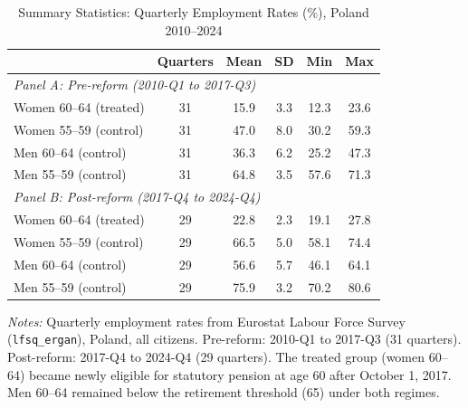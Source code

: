 \begin{table}[H]
\centering
\caption{Summary Statistics: Quarterly Employment Rates (\%), Poland 2010--2024}
\label{tab:summary}
\begin{threeparttable}
\begin{tabular}{lccccc}
\toprule
 & Quarters & Mean & SD & Min & Max \\
\midrule
\multicolumn{6}{l}{\textit{Panel A: Pre-reform (2010-Q1 to 2017-Q3)}} \\
Women 60--64 (treated) & 31 & 15.9 & 3.3 & 12.3 & 23.6 \\
Women 55--59 (control) & 31 & 47.0 & 8.0 & 30.2 & 59.3 \\
Men 60--64 (control) & 31 & 36.3 & 6.2 & 25.2 & 47.3 \\
Men 55--59 (control) & 31 & 64.8 & 3.5 & 57.6 & 71.3 \\
\midrule
\multicolumn{6}{l}{\textit{Panel B: Post-reform (2017-Q4 to 2024-Q4)}} \\
Women 60--64 (treated) & 29 & 22.8 & 2.3 & 19.1 & 27.8 \\
Women 55--59 (control) & 29 & 66.5 & 5.0 & 58.1 & 74.4 \\
Men 60--64 (control) & 29 & 56.6 & 5.7 & 46.1 & 64.1 \\
Men 55--59 (control) & 29 & 75.9 & 3.2 & 70.2 & 80.6 \\
\bottomrule
\end{tabular}
\begin{tablenotes}[flushleft]
\small
\item \textit{Notes:} Quarterly employment rates from Eurostat Labour Force Survey (\texttt{lfsq\_ergan}), Poland, all citizens. Pre-reform: 2010-Q1 to 2017-Q3 (31 quarters). Post-reform: 2017-Q4 to 2024-Q4 (29 quarters). The treated group (women 60--64) became newly eligible for statutory pension at age 60 after October 1, 2017. Men 60--64 remained below the retirement threshold (65) under both regimes.
\end{tablenotes}
\end{threeparttable}
\end{table}
